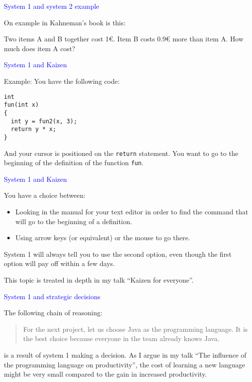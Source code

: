 \documentclass{slides}
\newcommand{\ti}[1]{\begin{center}\Large{\textcolor{blue}{#1}}\end{center}}
\begin{document}
\begin{slide}\ti{System 1 and system 2 example}

On example in Kahneman's book is this:

Two items A and B together cost 1\euro{}.  Item B costs 0.9\euro{}
more than item A.  How much does item A cost?

\vfill\end{slide}
\begin{slide}\ti{System 1 and Kaizen}

Example:  You have the following code:

\begin{verbatim}
int
fun(int x)
{
  int y = fun2(x, 3);
  return y * x;
}
\end{verbatim}

And your cursor is positioned on the \texttt{return} statement.  You
want to go to the beginning of the definition of the function
\texttt{fun}.

\vfill\end{slide}
\begin{slide}\ti{System 1 and Kaizen}

You have a choice between:

\begin{itemize}
\item Looking in the manual for your text editor in order to find the
  command that will go to the beginning of a definition.
\item Using arrow keys (or equivalent) or the mouse to go there.
\end{itemize}

System 1 will always tell you to use the second option, even though
the first option will pay off within a few days.

This topic is treated in depth in my talk ``Kaizen for everyone''.

\vfill\end{slide}
\begin{slide}\ti{System 1 and strategic decisions}

The following chain of reasoning:

\begin{quotation}
For the next project, let us choose Java as the programming language.
It is the best choice because everyone in the team already knows
Java.
\end{quotation}

is a result of system 1 making a decision.  As I argue in my talk
``The influence of the programming language on productivity'', the
cost of learning a new language might be very small compared to the
gain in increased productivity.
\vfill\end{slide}
\end{document}

